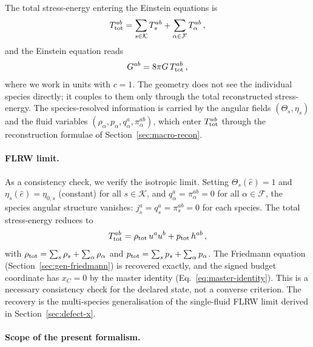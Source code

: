 The total stress-energy entering the Einstein equations is
\begin{equation}\label{eq:total-Tab}
T^{ab}_{\rm tot}
= \sum_{s \in \mathcal{K}} T_s^{ab}
+ \sum_{\alpha \in \mathcal{F}} T_\alpha^{ab}\,,
\end{equation}
and the Einstein equation reads
\begin{equation}\label{eq:Einstein-multi}
G^{ab} = 8\pi G\, T^{ab}_{\rm tot}\,,
\end{equation}
where we work in units with $c = 1$.  The geometry
does not see the individual species directly; it couples
to them only through the total reconstructed
stress-energy.  The species-resolved information is
carried by the angular fields $(\Theta_s, \eta_s)$ and
the fluid variables $(\rho_\alpha, p_\alpha,
q_\alpha^a, \pi_\alpha^{ab})$, which enter
$T^{ab}_{\rm tot}$ through the reconstruction formulae
of Section~\ref{sec:macro-recon}.


\paragraph{FLRW limit.}

As a consistency check, we verify the isotropic limit.
Setting $\Theta_s(\hat{e}) = 1$ and
$\eta_s(\hat{e}) = \eta_{0,s}$ (constant) for all
$s \in \mathcal{K}$, and $q_\alpha^a = \pi_\alpha^{ab}
= 0$ for all $\alpha \in \mathcal{F}$, the species
angular structure vanishes:
$j_s^a = q_s^a = \pi_s^{ab} = 0$ for each species.
The total stress-energy reduces to
\begin{equation}\label{eq:FLRW-limit-multi}
T^{ab}_{\rm tot}
= \rho_{\rm tot}\, u^a u^b
  + p_{\rm tot}\, h^{ab}\,,
\end{equation}
with $\rho_{\rm tot} = \sum_s \rho_s + \sum_\alpha
\rho_\alpha$ and $p_{\rm tot} = \sum_s p_s + \sum_\alpha
p_\alpha$.  The Friedmann equation
(Section~\ref{sec:gen-friedmann}) is recovered exactly,
and the signed budget coordinate has $x_C = 0$ by the master
identity (Eq.~\ref{eq:master-identity}).  This is a necessary
consistency check for the declared state, not a converse criterion.
The recovery is the
multi-species generalisation of the
single-fluid FLRW limit derived in
Section~\ref{sec:defect-x}.


\paragraph{Scope of the present formalism.}

